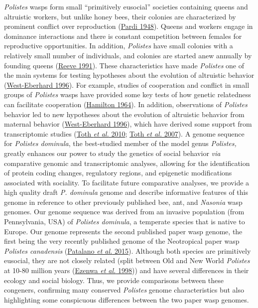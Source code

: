 \documentclass[]{article}
\begin{document}
\emph{Polistes} wasps form small ``primitively eusocial'' societies
containing queens and altruistic workers, but unlike honey bees, their
colonies are characterized by prominent conflict over reproduction
(\protect\hyperlink{ux5fENREFux5f41}{Pardi 1948}). Queens and workers
engage in dominance interactions and there is constant competition
between females for reproductive opportunities. In addition,
\emph{Polistes} have small colonies with a relatively small number of
individuals, and colonies are started anew annually by founding queens
(\protect\hyperlink{ux5fENREFux5f46}{Reeve 1991}). These characteristics
have made \emph{Polistes} one of the main systems for testing hypotheses
about the evolution of altruistic behavior
(\protect\hyperlink{ux5fENREFux5f71}{West-Eberhard 1996}). For example,
studies of cooperation and conflict in small groups of \emph{Polistes}
wasps have provided some key tests of how genetic relatedness can
facilitate cooperation (\protect\hyperlink{ux5fENREFux5f17}{Hamilton
1964}). In addition, observations of \emph{Polistes} behavior led to new
hypotheses about the evolution of altruistic behavior from maternal
behavior (\protect\hyperlink{ux5fENREFux5f71}{West-Eberhard 1996}),
which have derived some support from transcriptomic studies
(\protect\hyperlink{ux5fENREFux5f62}{Toth \emph{et al.} 2010};
\protect\hyperlink{ux5fENREFux5f63}{Toth \emph{et al.} 2007}). A genome
sequence for \emph{Polistes dominula}, the best-studied member of the
model genus \emph{Polistes,} greatly enhances our power to study the
genetics of social behavior \emph{via} comparative genomic and
transcriptomic analyses, allowing for the identification of protein
coding changes, regulatory regions, and epigenetic modifications
associated with sociality. To facilitate future comparative analyses, we
provide a high quality draft \emph{P. dominula} genome and describe
informative features of this genome in reference to other previously
published bee, ant, and \emph{Nasonia} wasp genomes. Our genome sequence
was derived from an invasive population (from Pennsylvania, USA) of
\emph{Polistes dominula}, a temperate species that is native to Europe.
Our genome represents the second published paper wasp genome, the first
being the very recently published genome of the Neotropical paper wasp
\emph{Polistes canadensis} (\protect\hyperlink{ux5fENREFux5f43}{Patalano
\emph{et al.} 2015}). Although both species are primitively eusocial,
they are not closely related (split between Old and New World
\emph{Polistes} at 10-80 million years
(\protect\hyperlink{ux5fENREFux5f9}{Ezenwa \emph{et al.} 1998})) and
have several differences in their ecology and social biology. Thus, we
provide comparisons between these congeners, confirming many conserved
\emph{Polistes} genome characteristics but also highlighting some
conspicuous differences between the two paper wasp genomes.
\end{document}
